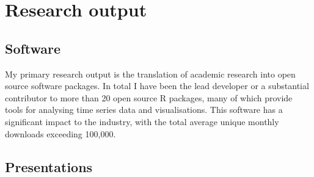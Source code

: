 \documentclass[11pt,a4paper,]{awesome-cv}
\begin{document}
\hypertarget{research-output}{%
\section{Research output}\label{research-output}}

\hypertarget{software}{%
\subsection{Software}\label{software}}

\begin{cvparagraph}
My primary research output is the translation of academic research into open source software packages. In total I have been the lead developer or a substantial contributor to more than 20 open source R packages, many of which provide tools for analysing time series data and visualisations. This software has a significant impact to the industry, with the total average unique monthly downloads exceeding 100,000.
\end{cvparagraph}

\hypertarget{presentations}{%
\subsection{Presentations}\label{presentations}}
\end{document}
